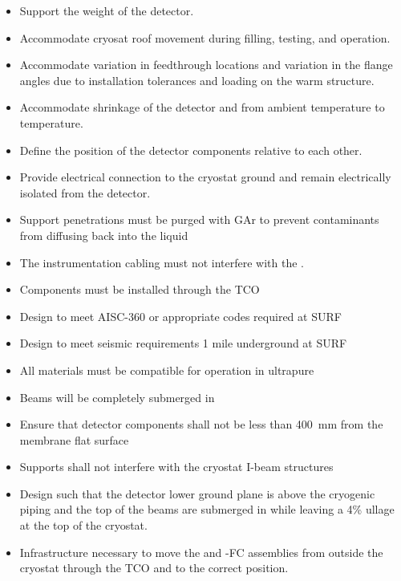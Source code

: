 \begin{itemize}
 \setlength\itemsep{1mm}
\setlength{\parsep}{1mm}
\setlength{\itemsep}{-5mm}
\item Support the weight of the detector.
\item Accommodate cryosat roof movement during filling, testing, and operation.
\item Accommodate variation in feedthrough locations and
  variation in the flange angles due to installation tolerances and
  loading on the warm structure.
\item Accommodate shrinkage of the detector and  from ambient
  temperature to  temperature.
\item Define the position of the detector components relative to each other. 
\item Provide electrical connection to the cryostat ground and remain electrically isolated from the detector.
\item Support penetrations must be purged with GAr to prevent contaminants from diffusing back into the liquid
\item The instrumentation cabling must not interfere with the .
\item Components must be installed through the TCO
\item Design to meet AISC-360 or appropriate codes required at SURF
\item Design to meet seismic requirements 1 mile underground at SURF
\item All materials must be compatible for operation in ultrapure 
\item Beams will be completely submerged in 
\item Ensure that detector components shall not be less than \SI{400}{mm} from the membrane flat surface
\item Supports shall not interfere with the cryostat I-beam structures
\item Design such that the detector lower ground plane is above the cryogenic piping and the top of the  beams are submerged in  while leaving a 4\% ullage at the top of the cryostat.
\item Infrastructure necessary to move the  and -FC assemblies from outside the cryostat through the TCO and to the correct position.
\end{itemize}

